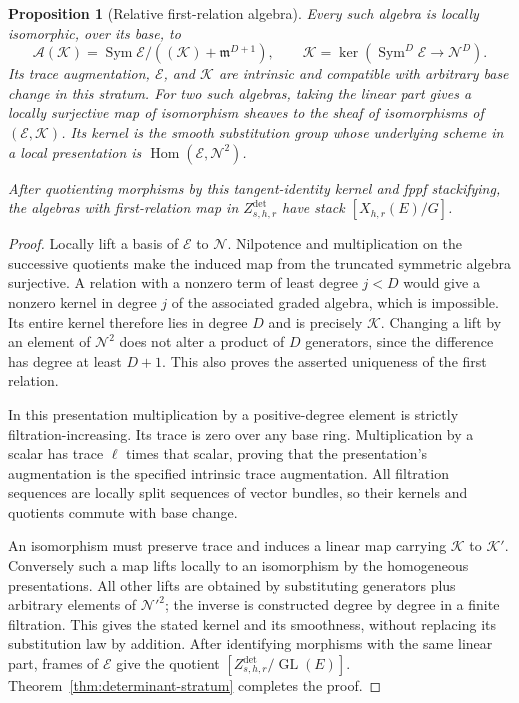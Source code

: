\documentclass[11pt,reqno]{amsart}
\numberwithin{equation}{section}
\newtheorem{proposition}[theorem]{Proposition}
\theoremstyle{definition}\newtheorem{definition}[theorem]{Definition}
\theoremstyle{remark}\newtheorem{remark}[theorem]{Remark}
\DeclareMathOperator{\Sym}{Sym}\DeclareMathOperator{\Gr}{Gr}
\DeclareMathOperator{\Hom}{Hom}\DeclareMathOperator{\Tot}{Tot}
\begin{document}
\begin{proposition}[Relative first-relation algebra]
\label{prop:relative-first-relation}
Every such algebra is locally isomorphic, over its base, to
\[
 \mathcal A(\mathcal K)=
 \Sym\mathcal E/((\mathcal K)+\mathfrak m^{D+1}),\qquad
 \mathcal K=\ker(\Sym^D\mathcal E\longrightarrow\mathcal N^D).
\]
Its trace augmentation, \(\mathcal E\), and \(\mathcal K\) are
intrinsic and compatible with arbitrary base change in this
stratum.  For two such algebras, taking the linear part gives a
locally surjective map of isomorphism sheaves to the sheaf of
isomorphisms of \((\mathcal E,\mathcal K)\).  Its kernel is the
smooth substitution group whose underlying scheme in a local
presentation is
\(\Hom(\mathcal E,\mathcal N^2)\).

After quotienting morphisms by this tangent-identity kernel and
fppf stackifying, the algebras with first-relation map in
\(Z^{\det}_{s,h,r}\) have stack \([X_{h,r}(E)/G]\).
\end{proposition}
\begin{proof}
Locally lift a basis of \(\mathcal E\) to \(\mathcal N\).
Nilpotence and multiplication on the successive quotients make the
induced map from the truncated symmetric algebra surjective.
A relation with a nonzero term of least degree \(j<D\) would give
a nonzero kernel in degree \(j\) of the associated graded algebra,
which is impossible.  Its entire kernel therefore lies in degree
\(D\) and is precisely \(\mathcal K\).  Changing a lift by an
element of \(\mathcal N^2\) does not alter a product of \(D\)
generators, since the difference has degree at least \(D+1\).
This also proves the asserted uniqueness of the first relation.

In this presentation multiplication by a positive-degree element
is strictly filtration-increasing.  Its trace is zero over any
base ring.  Multiplication by a scalar has trace \(\ell\) times
that scalar, proving that the presentation's augmentation is the
specified intrinsic trace augmentation.  All filtration sequences
are locally split sequences of vector bundles, so their kernels
and quotients commute with base change.

An isomorphism must preserve trace and induces a linear map carrying
\(\mathcal K\) to \(\mathcal K'\).  Conversely such a map lifts
locally to an isomorphism by the homogeneous presentations.  All
other lifts are obtained by substituting generators plus arbitrary
elements of \(\mathcal N'^2\); the inverse is constructed degree by
degree in a finite filtration.  This gives the stated kernel and
its smoothness, without replacing its substitution law by addition.
After identifying morphisms with the same linear part, frames of
\(\mathcal E\) give the quotient
\([Z^{\det}_{s,h,r}/\operatorname{GL}(E)]\).
Theorem~\ref{thm:determinant-stratum} completes the proof.
\end{proof}
\end{document}
